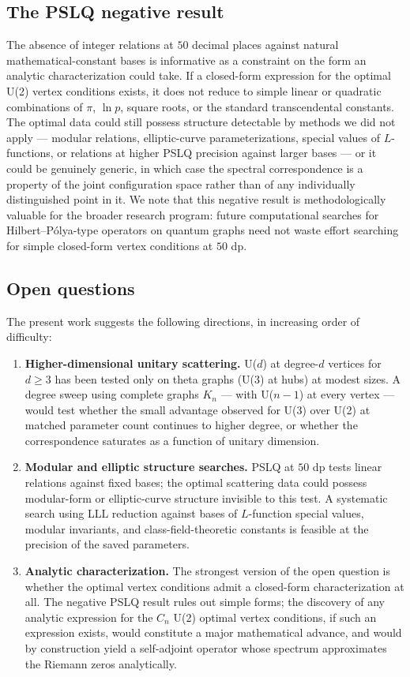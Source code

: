 \documentclass[cntp]{ipart}
\theoremstyle{plain}
\theoremstyle{remark}
\begin{document}
\subsection{The PSLQ negative result}
\label{sec:disc-pslq}

The absence of integer relations at $50$ decimal places against natural mathematical-constant bases is informative as a constraint on the form an analytic characterization could take. If a closed-form expression for the optimal U(2) vertex conditions exists, it does not reduce to simple linear or quadratic combinations of $\pi$, $\ln p$, square roots, or the standard transcendental constants. The optimal data could still possess structure detectable by methods we did not apply --- modular relations, elliptic-curve parameterizations, special values of $L$-functions, or relations at higher PSLQ precision against larger bases --- or it could be genuinely generic, in which case the spectral correspondence is a property of the joint configuration space rather than of any individually distinguished point in it. We note that this negative result is methodologically valuable for the broader research program: future computational searches for Hilbert--P\'olya-type operators on quantum graphs need not waste effort searching for simple closed-form vertex conditions at $50$ dp.

\subsection{Open questions}
\label{sec:disc-open}

The present work suggests the following directions, in increasing order of difficulty:
\begin{enumerate}
    \item \textbf{Higher-dimensional unitary scattering.} U($d$) at degree-$d$ vertices for $d \geq 3$ has been tested only on theta graphs (U(3) at hubs) at modest sizes. A degree sweep using complete graphs $K_n$ --- with U($n-1$) at every vertex --- would test whether the small advantage observed for U(3) over U(2) at matched parameter count continues to higher degree, or whether the correspondence saturates as a function of unitary dimension.
    \item \textbf{Modular and elliptic structure searches.} PSLQ at $50$ dp tests linear relations against fixed bases; the optimal scattering data could possess modular-form or elliptic-curve structure invisible to this test. A systematic search using LLL reduction against bases of $L$-function special values, modular invariants, and class-field-theoretic constants is feasible at the precision of the saved parameters.
    \item \textbf{Analytic characterization.} The strongest version of the open question is whether the optimal vertex conditions admit a closed-form characterization at all. The negative PSLQ result rules out simple forms; the discovery of any analytic expression for the $C_n$ U(2) optimal vertex conditions, if such an expression exists, would constitute a major mathematical advance, and would by construction yield a self-adjoint operator whose spectrum approximates the Riemann zeros analytically.
\end{enumerate}
\end{document}
